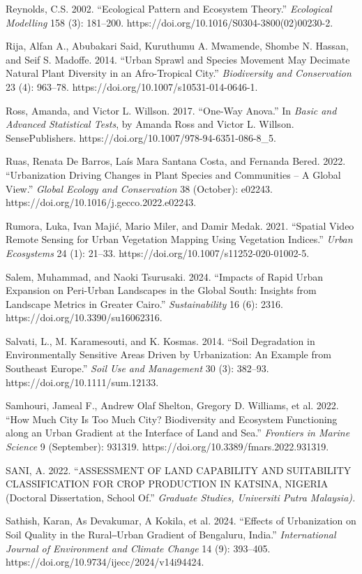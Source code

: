 Reynolds, C.S. 2002. ``Ecological Pattern and Ecosystem Theory.'' \emph{Ecological Modelling} 158 (3): 181--200. https://doi.org/10.1016/S0304-3800(02)00230-2.

Rija, Alfan A., Abubakari Said, Kuruthumu A. Mwamende, Shombe N. Hassan, and Seif S. Madoffe. 2014. ``Urban Sprawl and Species Movement May Decimate Natural Plant Diversity in an Afro-Tropical City.'' \emph{Biodiversity and Conservation} 23 (4): 963--78. https://doi.org/10.1007/s10531-014-0646-1.

Ross, Amanda, and Victor L. Willson. 2017. ``One-Way Anova.'' In \emph{Basic and Advanced Statistical Tests}, by Amanda Ross and Victor L. Willson. SensePublishers. https://doi.org/10.1007/978-94-6351-086-8\_5.

Ruas, Renata De Barros, Laís Mara Santana Costa, and Fernanda Bered. 2022. ``Urbanization Driving Changes in Plant Species and Communities -- A Global View.'' \emph{Global Ecology and Conservation} 38 (October): e02243. https://doi.org/10.1016/j.gecco.2022.e02243.

Rumora, Luka, Ivan Majić, Mario Miler, and Damir Medak. 2021. ``Spatial Video Remote Sensing for Urban Vegetation Mapping Using Vegetation Indices.'' \emph{Urban Ecosystems} 24 (1): 21--33. https://doi.org/10.1007/s11252-020-01002-5.

Salem, Muhammad, and Naoki Tsurusaki. 2024. ``Impacts of Rapid Urban Expansion on Peri-Urban Landscapes in the Global South: Insights from Landscape Metrics in Greater Cairo.'' \emph{Sustainability} 16 (6): 2316. https://doi.org/10.3390/su16062316.

Salvati, L., M. Karamesouti, and K. Kosmas. 2014. ``Soil Degradation in Environmentally Sensitive Areas Driven by Urbanization: An Example from Southeast Europe.'' \emph{Soil Use and Management} 30 (3): 382--93. https://doi.org/10.1111/sum.12133.

Samhouri, Jameal F., Andrew Olaf Shelton, Gregory D. Williams, et al. 2022. ``How Much City Is Too Much City? Biodiversity and Ecosystem Functioning along an Urban Gradient at the Interface of Land and Sea.'' \emph{Frontiers in Marine Science} 9 (September): 931319. https://doi.org/10.3389/fmars.2022.931319.

SANI, A. 2022. ``ASSESSMENT OF LAND CAPABILITY AND SUITABILITY CLASSIFICATION FOR CROP PRODUCTION IN KATSINA, NIGERIA (Doctoral Dissertation, School Of.'' \emph{Graduate Studies, Universiti Putra Malaysia).}

Sathish, Karan, As Devakumar, A Kokila, et al. 2024. ``Effects of Urbanization on Soil Quality in the Rural‒Urban Gradient of Bengaluru, India.'' \emph{International Journal of Environment and Climate Change} 14 (9): 393--405. https://doi.org/10.9734/ijecc/2024/v14i94424.

